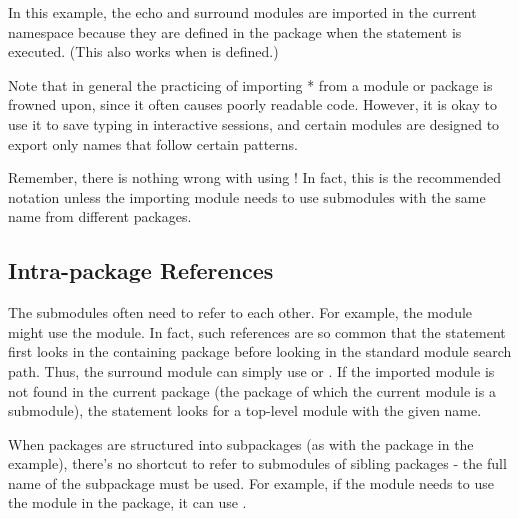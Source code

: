 \documentclass{manual}
\begin{document}
In this example, the echo and surround modules are imported in the
current namespace because they are defined in the 
package when the  statement is executed.  (This also
works when  is defined.)

Note that in general the practicing of importing * from a module or
package is frowned upon, since it often causes poorly readable code.
However, it is okay to use it to save typing in interactive sessions,
and certain modules are designed to export only names that follow
certain patterns.

Remember, there is nothing wrong with using !  In fact, this is the
recommended notation unless the importing module needs to use
submodules with the same name from different packages.


\subsection{Intra-package References}

The submodules often need to refer to each other.  For example, the
 module might use the  module.  In fact, such references
are so common that the  statement first looks in the
containing package before looking in the standard module search path.
Thus, the surround module can simply use  or
.  If the imported module is not
found in the current package (the package of which the current module
is a submodule), the  statement looks for a top-level module
with the given name.

When packages are structured into subpackages (as with the 
package in the example), there's no shortcut to refer to submodules of
sibling packages - the full name of the subpackage must be used.  For
example, if the module  needs to use the 
module in the  package, it can use .

\end{document}
